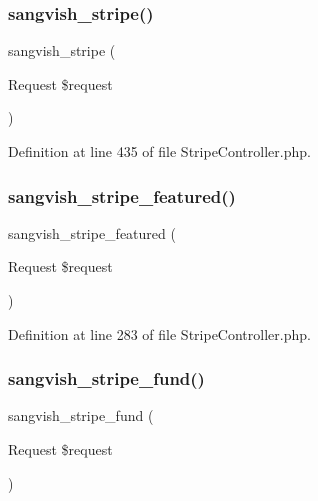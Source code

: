\subsubsection{\texorpdfstring{sangvish\_stripe()}{sangvish\_stripe()}}
{\footnotesize\ttfamily sangvish\+\_\+stripe (\begin{DoxyParamCaption}\item[{Request}]{\$request }\end{DoxyParamCaption})}



Definition at line 435 of file Stripe\+Controller.\+php.

\mbox{\label{class_responsive_1_1_http_1_1_controllers_1_1_stripe_controller_a405fe5b4c3f1853771959f339c5d00c3}} 
\subsubsection{\texorpdfstring{sangvish\_stripe\_featured()}{sangvish\_stripe\_featured()}}
{\footnotesize\ttfamily sangvish\+\_\+stripe\+\_\+featured (\begin{DoxyParamCaption}\item[{Request}]{\$request }\end{DoxyParamCaption})}



Definition at line 283 of file Stripe\+Controller.\+php.

\mbox{\label{class_responsive_1_1_http_1_1_controllers_1_1_stripe_controller_ae98aba9c82aca648744acc2284c3a2c3}} 
\subsubsection{\texorpdfstring{sangvish\_stripe\_fund()}{sangvish\_stripe\_fund()}}
{\footnotesize\ttfamily sangvish\+\_\+stripe\+\_\+fund (\begin{DoxyParamCaption}\item[{Request}]{\$request }\end{DoxyParamCaption})}

